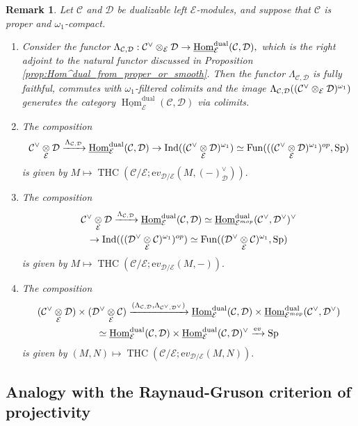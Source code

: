 \documentclass[11pt,leqno]{amsart}
\newtheorem{remark}[theo]{Remark}
\numberwithin{equation}{section}
\def\Hom{\operatorname{Hom}}
\newcommand{\tens}[1]{%
  \mathbin{\mathop{\otimes}\displaylimits_{#1}}%
}
\newcommand{\xto}{\xrightarrow}
\newcommand{\dual}{\operatorname{dual}}
\newcommand{\ev}{\mathrm ev}
\newcommand{\cD}{{\mathcal D}}
\newcommand{\cC}{{\mathcal C}}
\newcommand{\cE}{{\mathcal E}}
\newcommand{\un}{\underline}
\newcommand{\THC}{\operatorname{THC}}
\newcommand{\Fun}{\operatorname{Fun}}
\newcommand{\Sp}{\operatorname{Sp}}
\newcommand{\Ind}{\operatorname{Ind}}
\begin{document}
\begin{remark}
Let $\cC$ and $\cD$ be dualizable left $\cE$-modules, and suppose that $\cC$ is proper and $\omega_1$-compact.
\begin{enumerate}
\item Consider the functor $\Lambda_{\cC,\cD}:\cC^{\vee}\tens{\cE}\cD\to \un{\Hom}_{\cE}^{\dual}(\cC,\cD),$ which is the right adjoint to the natural functor discussed in Proposition \ref{prop:Hom^dual_from_proper_or_smooth}. Then the functor $\Lambda_{\cC,\cD}$ is fully faithful, commutes with $\omega_1$-filtered colimits and the image $\Lambda_{\cC,\cD}((\cC^{\vee}\tens{\cE}\cD)^{\omega_1})$ generates the category $\un{\Hom}_{\cE}^{\dual}(\cC,\cD)$ via colimits.
\item The composition
\begin{equation*}
\cC^{\vee}\tens{\cE}\cD\xto{\Lambda_{\cC,\cD}} \un{\Hom}_{\cE}^{\dual}(\cC,\cD)\to \Ind((\cC^{\vee}\tens{\cE}\cD)^{\omega_1})\simeq\Fun(((\cC^{\vee}\tens{\cE}\cD)^{\omega_1})^{op},\Sp)
\end{equation*}
is given by $M\mapsto \THC(\cC/\cE;\ev_{\cD/\cE}(M,(-)_{\cD}^{\vee})).$
\item The composition
\begin{multline*}
\cC^{\vee}\tens{\cE}\cD\xto{\Lambda_{\cC,\cD}} \un{\Hom}_{\cE}^{\dual}(\cC,\cD)\simeq\un{\Hom}_{\cE^{mop}}^{\dual}(\cC^{\vee},\cD^{\vee})^{\vee}\\
\to \Ind(((\cD^{\vee}\tens{\cE}\cC)^{\omega_1})^{op})\simeq \Fun((\cD^{\vee}\tens{\cE}\cC)^{\omega_1},\Sp)
\end{multline*}
is given by $M\mapsto \THC(\cC/\cE;\ev_{\cD/\cE}(M,-)).$
\item The composition
\begin{multline*}
(\cC^{\vee}\tens{\cE}\cD)\times (\cD^{\vee}\tens{\cE}\cC)\xto{(\Lambda_{\cC,\cD},\Lambda_{\cC^{\vee},\cD^{\vee}})} \un{\Hom}_{\cE}^{\dual}(\cC,\cD)\times \un{\Hom}_{\cE^{mop}}^{\dual}(\cC^{\vee},\cD^{\vee})\\
\simeq \un{\Hom}_{\cE}^{\dual}(\cC,\cD)\times \un{\Hom}_{\cE}^{\dual}(\cC,\cD)^{\vee}\xto{\ev}\Sp
\end{multline*}
is given by $(M,N)\mapsto \THC(\cC/\cE;\ev_{\cD/\cE}(M,N)).$
\end{enumerate}
\end{remark}

\subsection{Analogy with the Raynaud-Gruson criterion of projectivity}
\label{ssec:analogy_Raynaud_Gruson}
\end{document}
